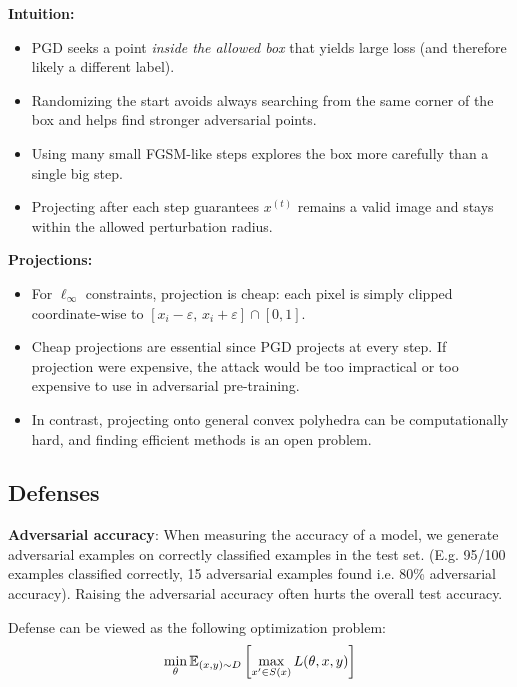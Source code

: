 \documentclass[11pt]{article}
\begin{document}
\begin{note}
	\textbf{Intuition:} 
	\begin{itemize}[leftmargin=*]
	  \item PGD seeks a point \emph{inside the allowed box} that yields large loss (and therefore likely a different label).
	  \item Randomizing the start avoids always searching from the same corner of the box and helps find stronger adversarial points.
	  \item Using many small FGSM-like steps explores the box more carefully than a single big step.
	  \item Projecting after each step guarantees $x^{(t)}$ remains a valid image and stays within the allowed perturbation radius.
	\end{itemize}
\end{note}

\begin{note}
    \textbf{Projections:}
    \begin{itemize}[leftmargin=*]
      \item For $\ell_\infty$ constraints, projection is cheap: each pixel is simply clipped coordinate-wise to $[x_i-\varepsilon,\,x_i+\varepsilon]\cap[0,1]$. 
      \item Cheap projections are essential since PGD projects at every step. If projection were expensive, the attack would be too impractical or too expensive to use in adversarial pre-training.
      \item In contrast, projecting onto general convex polyhedra can be computationally hard, and finding efficient methods is an open problem.
    \end{itemize}
\end{note}

\subsection{Defenses}
\textbf{Adversarial accuracy}: When measuring the accuracy of a model, we generate adversarial examples on correctly classified examples in the test set.  (E.g. 95/100 examples classified correctly, 15 adversarial examples found i.e. 80\% adversarial accuracy). Raising the adversarial accuracy often hurts the overall test accuracy. 

Defense can be viewed as the following optimization problem:
\[
	\min_\theta \mathbb{E}_{(x, y) \sim D}\left[ \max_{x' \in S(x)} L(\theta, x, y) \right]
\]
\end{document}
